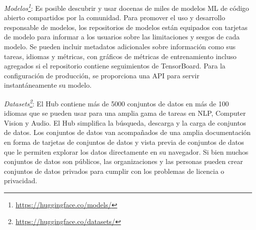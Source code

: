 \textit{Modelos\footnote[3]{\url{https://huggingface.co/models/}}}: Es posible descubrir y usar docenas de miles de modelos ML de código abierto compartidos por la comunidad. Para promover el uso y desarrollo responsable de modelos, los repositorios de modelos están equipados con tarjetas de modelo para informar a los usuarios sobre las limitaciones y sesgos de cada modelo. Se pueden incluir metadatos adicionales sobre información como sus tareas, idiomas y métricas, con gráficos de métricas de entrenamiento incluso agregados si el repositorio contiene seguimientos de TensorBoard. Para la configuración de producción, se proporciona una API para servir instantáneamente su modelo.

\textit{Datasets\footnote[4]{\url{https://huggingface.co/datasets/}}}: El Hub contiene más de 5000 conjuntos de datos en más de 100 idiomas que se pueden usar para una amplia gama de tareas en NLP, Computer Vision y Audio. El Hub simplifica la búsqueda, descarga y la carga de conjuntos de datos. Los conjuntos de datos van acompañados de una amplia documentación en forma de tarjetas de conjuntos de datos y vista previa de conjuntos de datos que le permiten explorar los datos directamente en su navegador. Si bien muchos conjuntos de datos son públicos, las organizaciones y las personas pueden crear conjuntos de datos privados para cumplir con los problemas de licencia o privacidad.